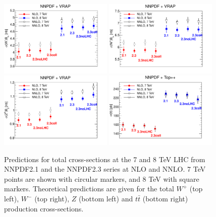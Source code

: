 \begin{figure}[ht]
\centering
\includegraphics[width=0.48\textwidth]{6-LHCimpact/figs/wm.pdf}
\includegraphics[width=0.48\textwidth]{6-LHCimpact/figs/wp.pdf}
\includegraphics[width=0.48\textwidth]{6-LHCimpact/figs/z.pdf}
\includegraphics[width=0.48\textwidth]{6-LHCimpact/figs/tt.pdf}
\caption[Predictions for total  $W/Z$ and top production cross-sections at the 7 and 8 TeV LHC]{Predictions for total cross-sections at the 7 and 8 TeV LHC from NNPDF2.1 and the NNPDF2.3 series at NLO and NNLO. 7 TeV points are shown with circular markers, and 8 TeV with square markers. Theoretical predictions are given for the total $W^+$ (top left), $W^-$ (top right), $Z$ (bottom left) and $t\bar{t}$ (bottom right) production cross-sections.}
\label{fig:totalxsecWZt}
\end{figure}


